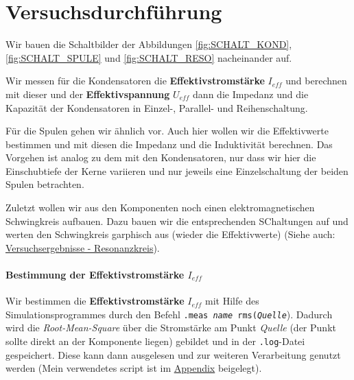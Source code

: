 \documentclass[10pt,a4paper]{article}
\begin{document}
\section{Versuchsdurchführung}
\begin{flushleft}
Wir bauen die Schaltbilder der Abbildungen \ref{fig:SCHALT_KOND}, \ref{fig:SCHALT_SPULE} und \ref{fig:SCHALT_RESO} nacheinander auf.

Wir messen für die Kondensatoren die \textbf{Effektivstromstärke} $I_{eff}$ und berechnen mit dieser und der \textbf{Effektivspannung} $U_{eff}$ dann die Impedanz und die Kapazität der Kondensatoren in Einzel-, Parallel- und Reihenschaltung.

Für die Spulen gehen wir ähnlich vor. Auch hier wollen wir die Effektivwerte bestimmen und mit diesen die Impedanz und die Induktivität berechnen. Das Vorgehen ist analog zu dem mit den Kondensatoren, nur dass wir hier die Einschubtiefe der Kerne variieren und nur jeweils eine Einzelschaltung der beiden Spulen betrachten.
\end{flushleft}
\begin{flushleft}
Zuletzt wollen wir aus den Komponenten noch einen elektromagnetischen Schwingkreis aufbauen. Dazu bauen wir die entsprechenden SChaltungen auf und werten den Schwingkreis garphisch aus (wieder die Effektivwerte) (Siehe auch: \hyperlink{sec:erg_resk}{Versuchsergebnisse - Resonanzkreis}).
\end{flushleft}

\paragraph{Bestimmung der Effektivstromstärke $I_{eff}$}
\begin{flushleft}
Wir bestimmen die \textbf{Effektivstromstärke} $I_{eff}$ mit Hilfe des Simulationsprogrammes durch den Befehl \texttt{.meas \textit{name} rms(\textit{Quelle}}). Dadurch wird die \textit{Root-Mean-Square} über die Stromstärke am Punkt \textit{Quelle} (der Punkt sollte direkt an der Komponente liegen) gebildet und in der \texttt{.log}-Datei gespeichert. Diese kann dann ausgelesen und zur weiteren Verarbeitung genutzt werden (Mein verwendetes script ist im \hyperlink{sec:appendix}{Appendix} beigelegt).
\end{flushleft}

\newpage
\end{document}
